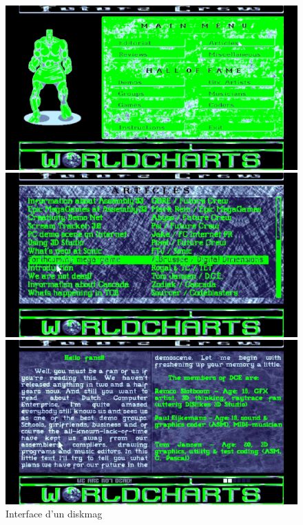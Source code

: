 \begin{figure}[h]
  \begin{minipage}[b]{0.30\linewidth}
    \centering
    \includegraphics[width=\linewidth]{images/demoscene/demos/diskmag3.png}
  \end{minipage}
  \hfill
  \begin{minipage}[b]{0.30\linewidth}
    \centering
    \includegraphics[width=\linewidth]{images/demoscene/demos/diskmag4.png}
  \end{minipage}
  \hfill
  \begin{minipage}[b]{0.30\linewidth}
    \centering
    \includegraphics[width=\linewidth]{images/demoscene/demos/diskmag5.png}
  \end{minipage}
  \caption{Interface d'un diskmag}
  \label{diskmagUI2}
\end{figure}


